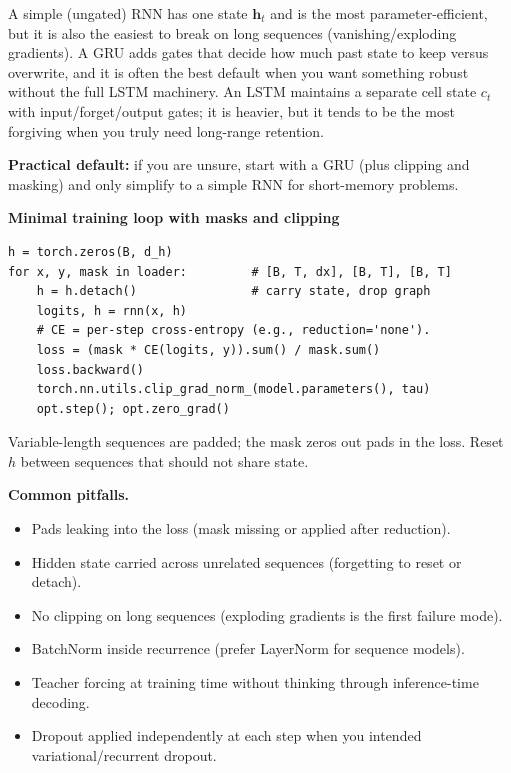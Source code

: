             \FloatBarrier
            \clearpage

            \begin{tcolorbox}[summarybox, title={Simple RNN vs.\ GRU vs.\ LSTM}]
A simple (ungated) RNN has one state \(\mathbf{h}_t\) and is the most parameter\hyp{}efficient, but it is also the easiest to break on long sequences (vanishing/exploding gradients). A GRU adds gates that decide how much past state to keep versus overwrite, and it is often the best default when you want something robust without the full LSTM machinery. An LSTM maintains a separate cell state \(c_t\) with input/forget/output gates; it is heavier, but it tends to be the most forgiving when you truly need long-range retention.
\par\smallskip
\textbf{Practical default:} if you are unsure, start with a GRU (plus clipping and masking) and only simplify to a simple RNN for short-memory problems.
\end{tcolorbox}

\begin{tcolorbox}[summarybox, title={Implementation checklist: masks, clipping, pitfalls}]
\textbf{Minimal training loop with masks and clipping}
\begin{verbatim}
h = torch.zeros(B, d_h)
for x, y, mask in loader:         # [B, T, dx], [B, T], [B, T]
    h = h.detach()                # carry state, drop graph
    logits, h = rnn(x, h)
    # CE = per-step cross-entropy (e.g., reduction='none').
    loss = (mask * CE(logits, y)).sum() / mask.sum()
    loss.backward()
    torch.nn.utils.clip_grad_norm_(model.parameters(), tau)
    opt.step(); opt.zero_grad()
\end{verbatim}
Variable-length sequences are padded; the mask zeros out pads in the loss. Reset \(h\) between sequences that should not share state.
\par\smallskip
\textbf{Common pitfalls.}
\begin{itemize}
    \item Pads leaking into the loss (mask missing or applied after reduction).
    \item Hidden state carried across unrelated sequences (forgetting to reset or detach).
    \item No clipping on long sequences (exploding gradients is the first failure mode).
    \item BatchNorm inside recurrence (prefer LayerNorm for sequence models).
    \item Teacher forcing at training time without thinking through inference-time decoding.
    \item Dropout applied independently at each step when you intended variational/recurrent dropout.
\end{itemize}
\end{tcolorbox}

